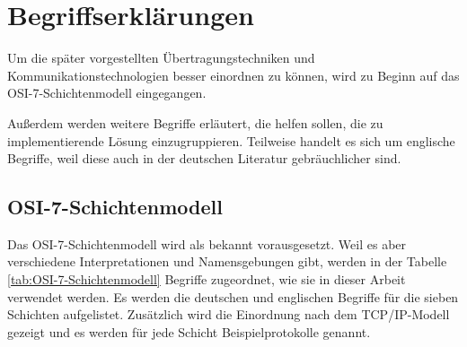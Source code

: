 \section{Begriffserklärungen}

Um die später vorgestellten Übertragungstechniken und Kommunikationstechnologien besser einordnen zu können, wird zu Beginn auf das OSI-7-Schichtenmodell eingegangen.

Außerdem werden weitere Begriffe erläutert, die helfen sollen, die zu implementierende Lösung einzugruppieren. Teilweise handelt es sich um englische Begriffe, weil diese auch in der deutschen Literatur gebräuchlicher sind.



\subsection{OSI-7-Schichtenmodell}

Das OSI-7-Schichtenmodell wird als bekannt vorausgesetzt. Weil es aber verschiedene Interpretationen und Namensgebungen gibt, werden in der Tabelle \ref{tab:OSI-7-Schichtenmodell} Begriffe zugeordnet, wie sie in dieser Arbeit verwendet werden. Es werden die deutschen und englischen Begriffe für die sieben Schichten aufgelistet. Zusätzlich wird die Einordnung nach dem TCP/IP-Modell \citep{RFC1122} gezeigt und es werden für jede Schicht Beispielprotokolle genannt.

